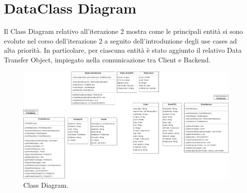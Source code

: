 \section{DataClass Diagram} 
Il Class Diagram relativo all'iterazione 2 mostra come le principali entità si sono evolute nel corso dell'iterazione 2 a seguito dell'introduzione
degli use cases ad alta priorità.
In particolare, per ciascuna entità è stato aggiunto il relativo Data Transfer Object, impiegato nella comunicazione tra Client e Backend.
\begin{figure}[h!]
	\centering
	\includegraphics[width=0.8\linewidth]{Iterazione 2/diagrams/class.drawio.png}
	\caption{Class Diagram.}
	\label{fig:ClassDiagram}
\end{figure}
